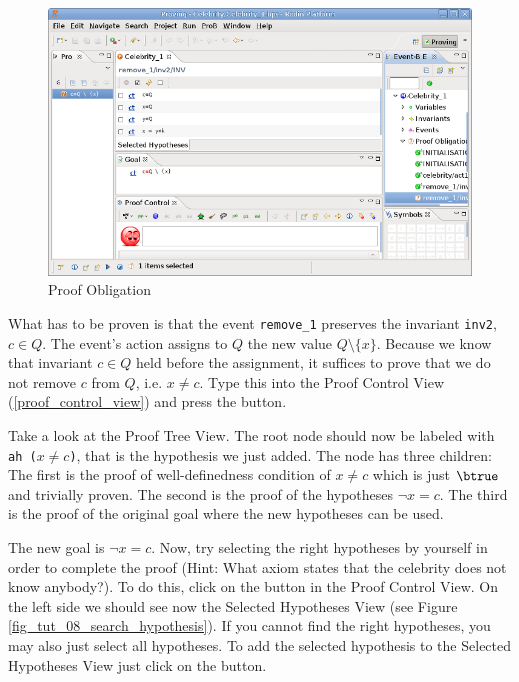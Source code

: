 \begin{figure}[!ht]
\begin{center}
	\includegraphics{img/tutorial/tut_08_proof2.png}
	\caption{Proof Obligation}
	\label{fig_tut_08_proof_obligation}
\end{center}
\end{figure}


What has to be proven is that the event \texttt{remove\_1} preserves the invariant \texttt{inv2},
  $c\in Q$.
The event's action assigns to $Q$ the new value $Q\setminus \{x\}$.
Because we know that invariant $c\in Q$ held before the assignment, 
 it suffices to prove that we do not remove $c$ from $Q$, i.e. \textsf{$x \neq c$}. Type this into the \textsf{Proof Control View} (\ref{proof_control_view}) and press the \textsf{ button}. 


Take a look at the Proof Tree View. The root node should now be labeled with \texttt{ah ($x\neq c$)},
  that is the hypothesis we just added.
The node has three children: The first is the proof of well-definedness condition of $x\neq c$ which is
  just $\btrue$ and trivially proven.
The second is the proof of the hypotheses $\lnot x=c$.
The third is the proof of the original goal where the new hypotheses can be used.

The new goal is $\lnot x = c$. Now, try selecting the right hypotheses by yourself in order to complete the proof (Hint: What axiom states that the celebrity does not know anybody?). To do this, click on the  button in the \textsf{Proof Control View}. On the left side we should see now the \textsf{Selected Hypotheses View} (see Figure \ref{fig_tut_08_search_hypothesis}). If you cannot find the right hypotheses, you may also just select all hypotheses. To add the selected hypothesis to the \textsf{Selected Hypotheses View} just click on the  button. 

